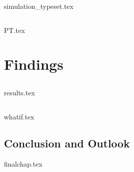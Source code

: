 \documentclass[UKenglish]{texmex/uiomasterthesis}
\begin{document}
{{simulation_typeset.tex}


\chapter{}\label{chap:PT}
    {{PT.tex}}
















\part{Findings}\label{part:findings}



\chapter{}\label{chap:results}
    {{results.tex}}


\chapter{}\label{chap:whatif}
    {{whatif.tex}}








\chapter{Conclusion and Outlook}
    {{finalchap.tex}}
}
\end{document}

